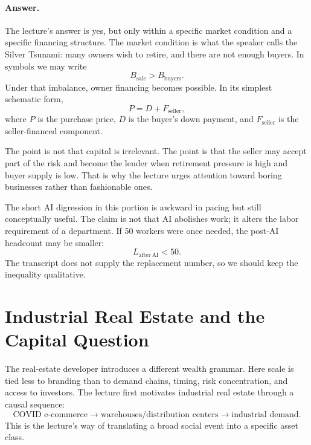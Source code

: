\paragraph{Answer.} The lecture's answer is yes, but only within a specific market condition and a specific financing structure. The market condition is what the speaker calls the Silver Tsunami: many owners wish to retire, and there are not enough buyers. In symbols we may write
\begin{equation}
B_{\mathrm{sale}} > B_{\mathrm{buyers}}.
\end{equation}
Under that imbalance, owner financing becomes possible. In its simplest schematic form,
\begin{equation}
P = D + F_{\mathrm{seller}},
\end{equation}
where \(P\) is the purchase price, \(D\) is the buyer's down payment, and \(F_{\mathrm{seller}}\) is the seller-financed component.

The point is not that capital is irrelevant. The point is that the seller may accept part of the risk and become the lender when retirement pressure is high and buyer supply is low. That is why the lecture urges attention toward boring businesses rather than fashionable ones.

The short AI digression in this portion is awkward in pacing but still conceptually useful. The claim is not that AI abolishes work; it alters the labor requirement of a department. If \(50\) workers were once needed, the post-AI headcount may be smaller:
\begin{equation}
L_{\mathrm{after\ AI}} < 50.
\end{equation}
The transcript does not supply the replacement number, so we should keep the inequality qualitative.

\section{Industrial Real Estate and the Capital Question}

The real-estate developer introduces a different wealth grammar. Here scale is tied less to branding than to demand chains, timing, risk concentration, and access to investors. The lecture first motivates industrial real estate through a causal sequence:
\begin{equation}
\text{COVID e-commerce} \to \text{warehouses/distribution centers} \to \text{industrial demand}.
\end{equation}
This is the lecture's way of translating a broad social event into a specific asset class.

